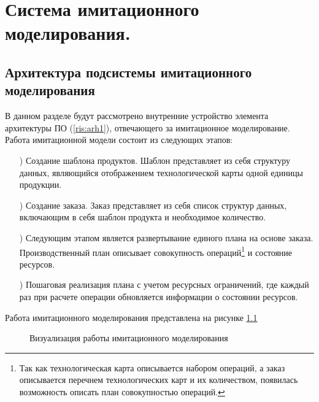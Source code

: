 \chapter{Система имитационного моделирования.}

\section{Архитектура подсистемы имитационного моделирования}

В данном разделе будут рассмотрено внутренние устройство элемента архитектуры ПО (\ref{ris:arh1}), отвечающего за имитационное моделирование. 
Работа имитационной модели состоит из следующих этапов:

\begin{enumerate}
    \item[\mylabel{itm:point1}{1})] Создание шаблона продуктов. Шаблон представляет из себя структуру данных, являющийся отображением технологической карты одной единицы продукции.
	\item[\mylabel{itm:point2}{2})] Создание заказа. Заказ представляет из себя список структур данных, включающим в себя шаблон продукта и необходимое количество.
	\item[\mylabel{itm:point3}{3})] Следующим этапом является развертывание единого плана на основе заказа. Производственный план описывает совокупность операций\footnote{Так как технологическая карта описывается набором операций, а заказ описывается перечнем технологических карт и их количеством, появилась возможность описать план совокупностью операций.} и состояние ресурсов.
    \item[\mylabel{itm:point4}{4})] Пошаговая реализация плана с учетом ресурсных ограничений, где каждый раз при расчете операции обновляется информации о состоянии ресурсов.
\end{enumerate}

Работа имитационного моделирования представлена на рисунке \ref{ris:alg}
\begin{figure}[H]
    \caption{Визуализация работы имитационного моделирования}
    \label{ris:alg}
\end{figure}


